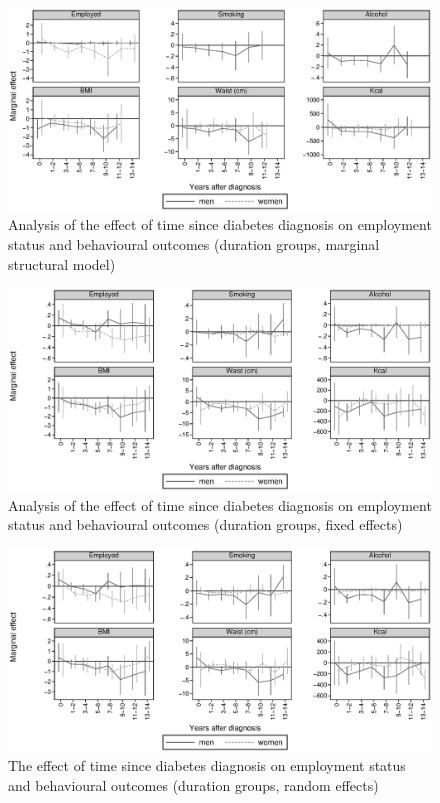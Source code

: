 \begin{landscape}

\begin{figure}
\begin{center}
\caption{\label{fig:duration_g_msm_mi} Analysis of the effect of time since diabetes diagnosis on employment status and behavioural outcomes (duration groups, marginal structural model)}
\includegraphics[width=\linewidth]{Chapter5/Figures/mi_msm_l_all.eps}
\end{center}
\end{figure}
\begin{figure}
\begin{center}
\caption{\label{fig:duration_g_fe_mi} Analysis of the effect of time since diabetes diagnosis on employment status and behavioural outcomes (duration groups, fixed effects)}
\includegraphics[width=\linewidth]{Chapter5/Figures/mi_fe.eps}
\end{center}
\end{figure}
\begin{figure}
\begin{center}
\caption{\label{fig:duration_g_re_mi} The effect of time since diabetes diagnosis on employment status and behavioural outcomes (duration groups, random effects)}
\includegraphics[width=\linewidth]{Chapter5/Figures/mi_re.eps}

\end{center}
\end{figure}
\end{landscape}
